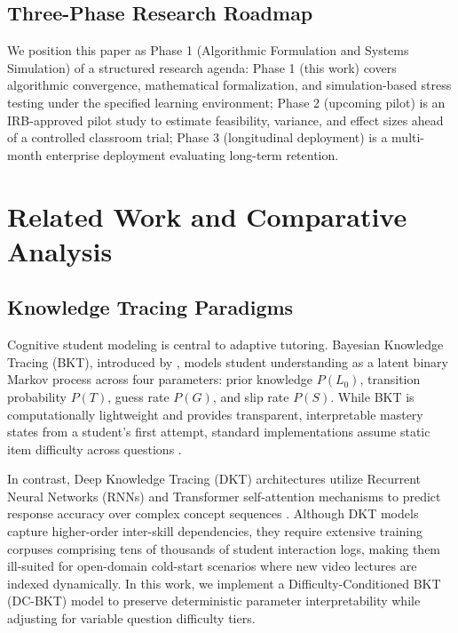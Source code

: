 \documentclass[notitlepage,12pt]{jedm}
\begin{document}
\subsection{Three-Phase Research Roadmap}
We position this paper as Phase 1 (Algorithmic Formulation and Systems Simulation) of a structured research agenda: Phase 1 (this work) covers algorithmic convergence, mathematical formalization, and simulation-based stress testing under the specified learning environment; Phase 2 (upcoming pilot) is an IRB-approved pilot study to estimate feasibility, variance, and effect sizes ahead of a controlled classroom trial; Phase 3 (longitudinal deployment) is a multi-month enterprise deployment evaluating long-term retention.

\section{Related Work and Comparative Analysis}

\subsection{Knowledge Tracing Paradigms}
Cognitive student modeling is central to adaptive tutoring. Bayesian Knowledge Tracing (BKT), introduced by \cite{corbett1994knowledge}, models student understanding as a latent binary Markov process across four parameters: prior knowledge $P(L_0)$, transition probability $P(T)$, guess rate $P(G)$, and slip rate $P(S)$. While BKT is computationally lightweight and provides transparent, interpretable mastery states from a student's first attempt, standard implementations assume static item difficulty across questions \cite{baker2008more,yudelson2013individualized}.

In contrast, Deep Knowledge Tracing (DKT) architectures utilize Recurrent Neural Networks (RNNs) and Transformer self-attention mechanisms to predict response accuracy over complex concept sequences \cite{piech2015deep}. Although DKT models capture higher-order inter-skill dependencies, they require extensive training corpuses comprising tens of thousands of student interaction logs, making them ill-suited for open-domain cold-start scenarios where new video lectures are indexed dynamically. In this work, we implement a Difficulty-Conditioned BKT (DC-BKT) model to preserve deterministic parameter interpretability while adjusting for variable question difficulty tiers.
\end{document}
